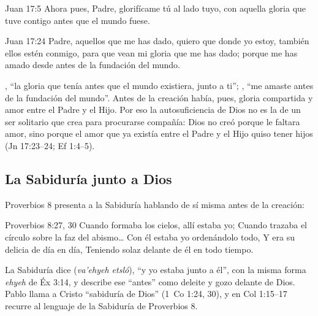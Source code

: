 \begin{verso}{Juan 17:5}
Ahora pues, Padre, glorifícame tú al lado tuyo, con aquella gloria que tuve contigo antes que el mundo fuese.
\end{verso}
\begin{verso}{Juan 17:24}
Padre, aquellos que me has dado, quiero que donde yo estoy, también ellos estén conmigo, para que vean mi gloria que me has dado; porque me has amado desde antes de la fundación del mundo.
\end{verso}

, ``la gloria que tenía antes que el mundo existiera, junto a ti''; , ``me amaste antes de la fundación del mundo''. Antes de la creación había, pues, gloria compartida y amor entre el Padre y el Hijo. Por eso la autosuficiencia de Dios no es la de un ser solitario que crea para procurarse compañía: Dios no creó porque le faltara amor, sino porque el amor que ya existía entre el Padre y el Hijo quiso tener hijos (Jn 17:23--24; Ef 1:4--5).


\subsection{La Sabiduría junto a Dios}
Proverbios 8 presenta a la Sabiduría hablando de sí misma antes de la creación:

\begin{verso}{Proverbios 8:27, 30}
Cuando formaba los cielos, allí estaba yo; Cuando trazaba el círculo sobre la faz del abismo\ldots{} Con él estaba yo ordenándolo todo, Y era su delicia de día en día, Teniendo solaz delante de él en todo tiempo.
\end{verso}

La Sabiduría dice  (\emph{va'ehyeh etsló}), ``y yo estaba junto a él'', con la misma forma \emph{ehyeh} de Éx 3:14, y describe ese ``antes'' como deleite y gozo delante de Dios. Pablo llama a Cristo ``sabiduría de Dios'' (1~Co 1:24, 30), y en Col 1:15--17 recurre al lenguaje de la Sabiduría de Proverbios 8.

